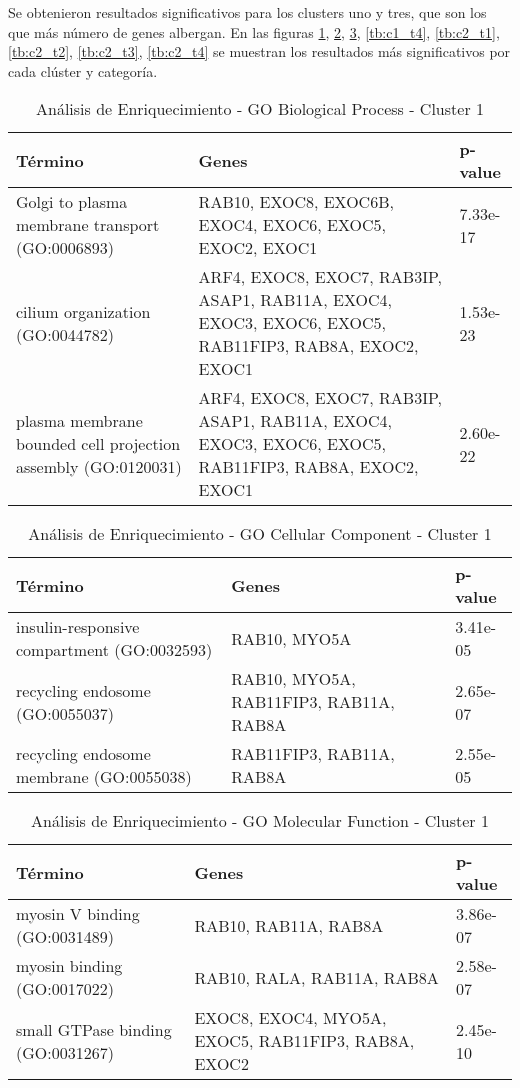 Se obtenieron resultados significativos para los clusters uno y tres, que son los que más número de genes albergan. En las figuras \ref{tb:c1_t1}, \ref{tb:c1_t2}, \ref{tb:c1_t3}, \ref{tb:c1_t4}, \ref{tb:c2_t1}, \ref{tb:c2_t2}, \ref{tb:c2_t3}, \ref{tb:c2_t4} se muestran los resultados más significativos por cada clúster y categoría.
\begin{table}[H]
	\centering
	\caption{Análisis de Enriquecimiento - GO Biological Process - Cluster 1}
	\label{tb:c1_t1}
	\begin{tabular}{|p{4cm}|p{4cm}|p{3cm}|}
		\hline
		\textbf{Término} & \textbf{Genes} & \textbf{p-value} \\ \hline
		Golgi to plasma membrane transport (GO:0006893) & RAB10, EXOC8, EXOC6B, EXOC4, EXOC6, EXOC5, EXOC2, EXOC1 & 7.33e-17 \\ \hline
		cilium organization (GO:0044782) & ARF4, EXOC8, EXOC7, RAB3IP, ASAP1, RAB11A, EXOC4, EXOC3, EXOC6, EXOC5, RAB11FIP3, RAB8A, EXOC2, EXOC1 & 1.53e-23 \\ \hline
		plasma membrane bounded cell projection assembly (GO:0120031) & ARF4, EXOC8, EXOC7, RAB3IP, ASAP1, RAB11A, EXOC4, EXOC3, EXOC6, EXOC5, RAB11FIP3, RAB8A, EXOC2, EXOC1 & 2.60e-22 \\ \hline
	\end{tabular}
\end{table}

\begin{table}[H]
	\centering
	\caption{Análisis de Enriquecimiento - GO Cellular Component - Cluster 1}
	\label{tb:c1_t2}
	\begin{tabular}{|p{4cm}|p{4cm}|p{3cm}|}
		\hline
		\textbf{Término} & \textbf{Genes} & \textbf{p-value} \\ \hline
		insulin-responsive compartment (GO:0032593) & RAB10, MYO5A & 3.41e-05 \\ \hline
		recycling endosome (GO:0055037) & RAB10, MYO5A, RAB11FIP3, RAB11A, RAB8A & 2.65e-07 \\ \hline
		recycling endosome membrane (GO:0055038) & RAB11FIP3, RAB11A, RAB8A & 2.55e-05 \\ \hline
	\end{tabular}
\end{table}

\begin{table}[H]
	\centering
	\caption{Análisis de Enriquecimiento - GO Molecular Function - Cluster 1}
	\label{tb:c1_t3}
	\begin{tabular}{|p{4cm}|p{4cm}|p{3cm}|}
		\hline
		\textbf{Término} & \textbf{Genes} & \textbf{p-value} \\ \hline
		myosin V binding (GO:0031489) & RAB10, RAB11A, RAB8A & 3.86e-07 \\ \hline
		myosin binding (GO:0017022) & RAB10, RALA, RAB11A, RAB8A & 2.58e-07 \\ \hline
		small GTPase binding (GO:0031267) & EXOC8, EXOC4, MYO5A, EXOC5, RAB11FIP3, RAB8A, EXOC2 & 2.45e-10 \\ \hline
	\end{tabular}
\end{table}

